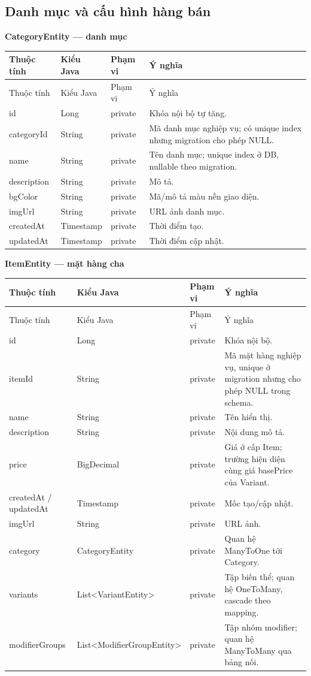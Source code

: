 \documentclass[12pt,a4paper,oneside]{report}
\newcommand{\ClassTableTitle}[1]{\par\medskip\noindent\textbf{#1}\par\smallskip}
\begin{document}
\subsection{Danh mục và cấu hình hàng bán}
\ClassTableTitle{CategoryEntity — danh mục}
\small\begin{longtable}{@{}D{3.25cm}D{3.35cm}D{1.35cm}D{6.75cm}@{}}\toprule Thuộc tính & Kiểu Java & Phạm vi & Ý nghĩa\\\midrule\endfirsthead\toprule Thuộc tính & Kiểu Java & Phạm vi & Ý nghĩa\\\midrule\endhead\bottomrule\endfoot
id & Long & private & Khóa nội bộ tự tăng.\\categoryId & String & private & Mã danh mục nghiệp vụ; có unique index nhưng migration cho phép NULL.\\name & String & private & Tên danh mục; unique index ở DB, nullable theo migration.\\description & String & private & Mô tả.\\bgColor & String & private & Mã/mô tả màu nền giao diện.\\imgUrl & String & private & URL ảnh danh mục.\\createdAt & Timestamp & private & Thời điểm tạo.\\updatedAt & Timestamp & private & Thời điểm cập nhật.\\\end{longtable}\normalsize

\ClassTableTitle{ItemEntity — mặt hàng cha}
\small\begin{longtable}{@{}D{3.25cm}D{3.35cm}D{1.35cm}D{6.75cm}@{}}\toprule Thuộc tính & Kiểu Java & Phạm vi & Ý nghĩa\\\midrule\endfirsthead\toprule Thuộc tính & Kiểu Java & Phạm vi & Ý nghĩa\\\midrule\endhead\bottomrule\endfoot
id & Long & private & Khóa nội bộ.\\itemId & String & private & Mã mặt hàng nghiệp vụ, unique ở migration nhưng cho phép NULL trong schema.\\name & String & private & Tên hiển thị.\\description & String & private & Nội dung mô tả.\\price & BigDecimal & private & Giá ở cấp Item; trường hiện diện cùng giá basePrice của Variant.\allowbreak \\createdAt / updatedAt & Timestamp & private & Mốc tạo/cập nhật.\\imgUrl & String & private & URL ảnh.\\category & CategoryEntity & private & Quan hệ ManyToOne tới Category.\allowbreak \\variants & List\textless VariantEntity\textgreater & private & Tập biến thể; quan hệ OneToMany, cascade theo mapping.\\modifierGroups & List\textless\allowbreak ModifierGroupEntity\textgreater & private & Tập nhóm modifier; quan hệ ManyToMany qua bảng nối.\\\end{longtable}\normalsize
\end{document}
